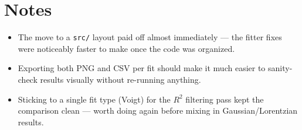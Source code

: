 \documentclass[12pt]{article}
\begin{document}
\section{Notes}
\label{sec:notes}

\begin{itemize}[leftmargin=*]
  \item The move to a \texttt{src/} layout paid off almost immediately --- the fitter fixes were noticeably faster to make once the code was organized.
  \item Exporting both PNG and CSV per fit should make it much easier to sanity-check results visually without re-running anything.
  \item Sticking to a single fit type (Voigt) for the $R^2$ filtering pass kept the comparison clean --- worth doing again before mixing in Gaussian/Lorentzian results.
\end{itemize}
\end{document}
